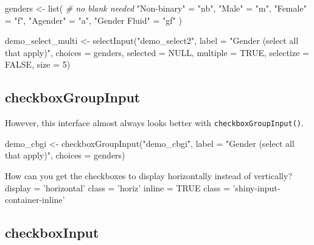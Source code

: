 \documentclass[
  oneside]{book}
\newenvironment{Shaded}{\begin{snugshade}}{\end{snugshade}}
\newcommand{\AttributeTok}[1]{\textcolor[rgb]{0.77,0.63,0.00}{#1}}
\newcommand{\CommentTok}[1]{\textcolor[rgb]{0.56,0.35,0.01}{\textit{#1}}}
\newcommand{\ConstantTok}[1]{\textcolor[rgb]{0.00,0.00,0.00}{#1}}
\newcommand{\DecValTok}[1]{\textcolor[rgb]{0.00,0.00,0.81}{#1}}
\newcommand{\FunctionTok}[1]{\textcolor[rgb]{0.00,0.00,0.00}{#1}}
\newcommand{\NormalTok}[1]{#1}
\newcommand{\OtherTok}[1]{\textcolor[rgb]{0.56,0.35,0.01}{#1}}
\newcommand{\StringTok}[1]{\textcolor[rgb]{0.31,0.60,0.02}{#1}}
\begin{document}
\begin{Shaded}
\begin{Highlighting}[]
\NormalTok{genders }\OtherTok{\textless{}{-}} \FunctionTok{list}\NormalTok{( }\CommentTok{\# no blank needed}
  \StringTok{"Non{-}binary"} \OtherTok{=} \StringTok{"nb"}\NormalTok{,}
  \StringTok{"Male"} \OtherTok{=} \StringTok{"m"}\NormalTok{,}
  \StringTok{"Female"} \OtherTok{=} \StringTok{"f"}\NormalTok{,}
  \StringTok{"Agender"} \OtherTok{=} \StringTok{"a"}\NormalTok{,}
  \StringTok{"Gender Fluid"} \OtherTok{=} \StringTok{"gf"}
\NormalTok{)}

\NormalTok{demo\_select\_multi }\OtherTok{\textless{}{-}} 
  \FunctionTok{selectInput}\NormalTok{(}\StringTok{"demo\_select2"}\NormalTok{, }
              \AttributeTok{label =} \StringTok{"Gender (select all that apply)"}\NormalTok{, }
              \AttributeTok{choices =}\NormalTok{ genders,}
              \AttributeTok{selected =} \ConstantTok{NULL}\NormalTok{,}
              \AttributeTok{multiple =} \ConstantTok{TRUE}\NormalTok{, }
              \AttributeTok{selectize =} \ConstantTok{FALSE}\NormalTok{,}
              \AttributeTok{size =} \DecValTok{5}\NormalTok{)}
\end{Highlighting}
\end{Shaded}

\hypertarget{checkboxgroupinput}{%
\subsection{checkboxGroupInput}\label{checkboxgroupinput}}

However, this interface almost always looks better with \texttt{checkboxGroupInput}\texttt{()}.

\begin{Shaded}
\begin{Highlighting}[]
\NormalTok{demo\_cbgi }\OtherTok{\textless{}{-}} \FunctionTok{checkboxGroupInput}\NormalTok{(}\StringTok{"demo\_cbgi"}\NormalTok{, }\AttributeTok{label =} \StringTok{"Gender (select all that apply)"}\NormalTok{,}
    \AttributeTok{choices =}\NormalTok{ genders)}
\end{Highlighting}
\end{Shaded}

How can you get the checkboxes to display horizontally instead of vertically?\\
display = 'horizontal' class = 'horiz' inline = TRUE class = 'shiny-input-container-inline'

\hypertarget{checkboxinput}{%
\subsection{checkboxInput}\label{checkboxinput}}
\end{document}
